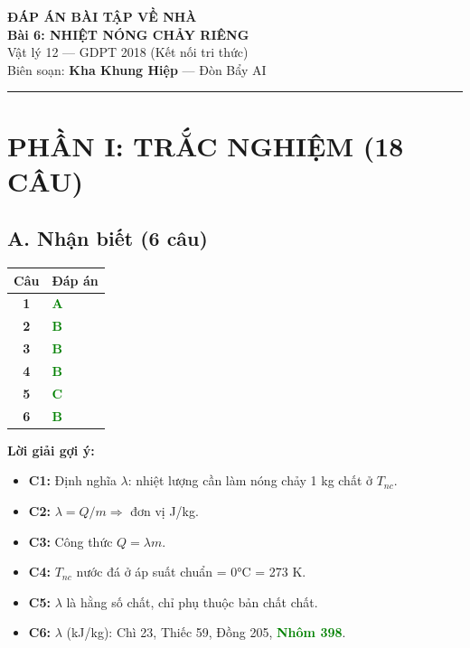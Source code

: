 \documentclass[12pt,a4paper]{article}
\newcommand{\dapan}[1]{\textcolor{green}{\textbf{#1}}}
\begin{document}
\begin{center}
    {\LARGE \textbf{ĐÁP ÁN BÀI TẬP VỀ NHÀ}}\\[4pt]
    {\Large \textbf{Bài 6: NHIỆT NÓNG CHẢY RIÊNG}}\\[4pt]
    {\normalsize Vật lý 12 — GDPT 2018 (Kết nối tri thức)}\\[4pt]
    {\small Biên soạn: \textbf{Kha Khung Hiệp} — Đòn Bẩy AI}
\end{center}

\vspace{1em}
\hrule
\vspace{1em}


\section*{PHẦN I: TRẮC NGHIỆM (18 CÂU)}

\subsection*{A. Nhận biết (6 câu)}

\begin{longtable}{>{\bfseries}cl}
\toprule
Câu & Đáp án \\ \midrule
1 & \dapan{A} \\ 
2 & \dapan{B} \\ 
3 & \dapan{B} \\ 
4 & \dapan{B} \\ 
5 & \dapan{C} \\ 
6 & \dapan{B} \\ \bottomrule
\end{longtable}

\noindent\textbf{Lời giải gợi ý:}
\begin{itemize}
    \item \textbf{C1:} Định nghĩa $\lambda$: nhiệt lượng cần làm nóng chảy 1 kg chất ở $T_{nc}$.
    \item \textbf{C2:} $\lambda = Q/m \Rightarrow$ đơn vị J/kg.
    \item \textbf{C3:} Công thức $Q = \lambda m$.
    \item \textbf{C4:} $T_{nc}$ nước đá ở áp suất chuẩn = 0°C = 273 K.
    \item \textbf{C5:} $\lambda$ là hằng số chất, chỉ phụ thuộc bản chất chất.
    \item \textbf{C6:} $\lambda$ (kJ/kg): Chì 23, Thiếc 59, Đồng 205, \dapan{Nhôm 398}.
\end{itemize}
\end{document}

